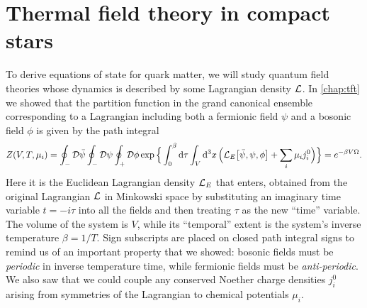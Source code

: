 \section{Thermal field theory in compact stars}
\label{sec:master_intro:tft}

To derive equations of state for quark matter, we will study quantum field theories whose dynamics is described by some Lagrangian density $\mathcal{L}$.
In \cref{chap:tft} we showed that the partition function in the grand canonical ensemble corresponding to a Lagrangian including both a fermionic field $\psi$ and a bosonic field $\phi$ is given by the path integral
\begin{equation}
	Z(V, T, \mu_i) = \oint_- \mathcal{D} \bar{\psi} \oint_- \mathcal{D} \psi \oint_+ \mathcal{D} \phi \exp \Big\{ \int_0^\beta \mathop{}\!\mathrm{d} \tau \int_V \mathop{}\!\mathrm{d}^3 x \, \Big( \mathcal{L}_E\big[\bar{\psi}, \psi, \phi\big] + \sum_i \mu_i j^0_i \Big) \Big\} = e^{-\beta V \Omega} .
\label{eq:master_intro:partition_function}
\end{equation}
Here it is the Euclidean Lagrangian density $\mathcal{L}_E$ that enters,
obtained from the original Lagrangian $\mathcal{L}$ in Minkowski space by substituting an imaginary time variable $t = -i \tau$ into all the fields and then treating $\tau$ as the new ``time'' variable.
The volume of the system is $V$, while its ``temporal'' extent is the system's inverse temperature $\beta = 1/T$.
Sign subscripts are placed on closed path integral signs to remind us of an important property that we showed: bosonic fields must be \emph{periodic} in inverse temperature time, while fermionic fields must be \emph{anti-periodic}.
We also saw that we could couple any conserved Noether charge densities $j^0_i$ arising from symmetries of the Lagrangian to chemical potentials $\mu_i$.

